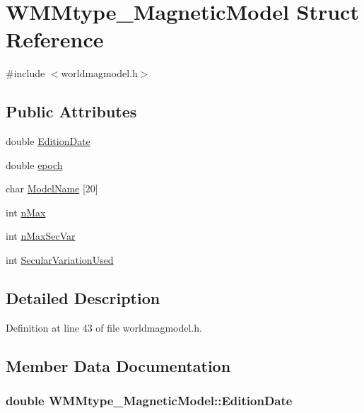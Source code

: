 \hypertarget{struct_w_m_mtype___magnetic_model}{\section{\-W\-M\-Mtype\-\_\-\-Magnetic\-Model \-Struct \-Reference}
\label{struct_w_m_mtype___magnetic_model}
}


{\ttfamily \#include $<$worldmagmodel.\-h$>$}

\subsection*{\-Public \-Attributes}
\begin{DoxyCompactItemize}
\item 
double \hyperlink{struct_w_m_mtype___magnetic_model_a6bbf5c3bb1eed0c4178a11cc92533530}{\-Edition\-Date}
\item 
double \hyperlink{struct_w_m_mtype___magnetic_model_ad2771cf6f5255fee58bff61029680f82}{epoch}
\item 
char \hyperlink{struct_w_m_mtype___magnetic_model_a11d5a44016770e140c397467b40c7755}{\-Model\-Name} \mbox{[}20\mbox{]}
\item 
int \hyperlink{struct_w_m_mtype___magnetic_model_a3cea165ace9c22b7301ac75ae8cacedb}{n\-Max}
\item 
int \hyperlink{struct_w_m_mtype___magnetic_model_a8a16d64376b1a82317aaffc2917271bb}{n\-Max\-Sec\-Var}
\item 
int \hyperlink{struct_w_m_mtype___magnetic_model_aedce5f50c04bdcf6c244f5b1845ff6f4}{\-Secular\-Variation\-Used}
\end{DoxyCompactItemize}


\subsection{\-Detailed \-Description}


\-Definition at line 43 of file worldmagmodel.\-h.



\subsection{\-Member \-Data \-Documentation}
\hypertarget{struct_w_m_mtype___magnetic_model_a6bbf5c3bb1eed0c4178a11cc92533530}{
\subsubsection[{\-Edition\-Date}]{\setlength{\rightskip}{0pt plus 5cm}double {\bf \-W\-M\-Mtype\-\_\-\-Magnetic\-Model\-::\-Edition\-Date}}}\label{struct_w_m_mtype___magnetic_model_a6bbf5c3bb1eed0c4178a11cc92533530}


